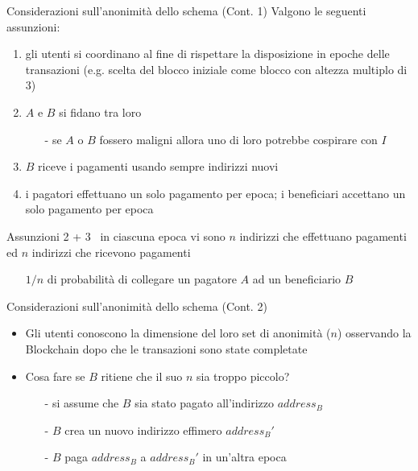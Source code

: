 \documentclass{beamer}
\begin{document}
  
  
  
  \begin{frame}{Considerazioni sull'anonimità dello schema (Cont. 1)}
      Valgono le seguenti assunzioni: 
      \begin{enumerate}
          \item gli utenti si coordinano al fine di rispettare la disposizione in epoche delle transazioni (e.g. scelta del blocco iniziale come blocco con altezza multiplo di 3) 
          \item $A$ e $B$ si fidano tra loro 
          \begin{itemize}
              \item[-] se $A$ o $B$ fossero maligni allora uno di loro potrebbe cospirare con $I$
          \end{itemize}
          \item $B$ riceve i pagamenti usando sempre indirizzi nuovi
          \item i pagatori effettuano un solo pagamento per epoca; i beneficiari accettano un solo pagamento per epoca
      \end{enumerate}
      \pause
      \begin{block}{}
      Assunzioni 2 + 3 \MVRightarrow\, in ciascuna epoca vi sono $n$ indirizzi che effettuano pagamenti ed $n$ indirizzi che ricevono pagamenti
      \begin{itemize}
          \item[\MVRightarrow] $1/n$ di probabilità di collegare un pagatore $A$ ad un beneficiario $B$
      \end{itemize}
      \end{block}
  \end{frame}
  
  
  
  \begin{frame}{Considerazioni sull'anonimità dello schema (Cont. 2)}
      \begin{itemize}
          \item Gli utenti conoscono la dimensione del loro set di anonimità ($n$) osservando la Blockchain dopo che le transazioni sono state completate
          \item Cosa fare se $B$ ritiene che il suo $n$ sia troppo piccolo? \pause
          \begin{itemize}
              \item[-] si assume che $B$ sia stato pagato all'indirizzo $address_B$
              \item[-] $B$ crea un nuovo indirizzo effimero $address_B'$
              \item[-] $B$ paga $address_B$ a $address_B'$ in un'altra epoca
          \end{itemize}
      \end{itemize}
  \end{frame}
  
\end{document}
